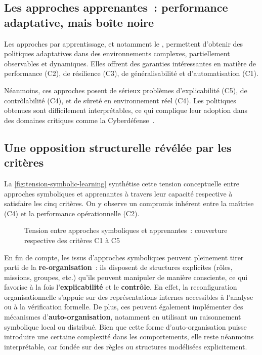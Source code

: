 \subsection{Les approches apprenantes~: performance adaptative, mais boîte noire}

Les approches par apprentissage, et notamment le , permettent d'obtenir des politiques adaptatives dans des environnements complexes, partiellement observables et dynamiques. Elles offrent des garanties intéressantes en matière de performance (C2), de résilience (C3), de généralisabilité et d'automatisation (C1).

Néanmoins, ces approches posent de sérieux problèmes d'explicabilité (C5), de contrôlabilité (C4), et de sûreté en environnement réel (C4). Les politiques obtenues sont difficilement interprétables, ce qui complique leur adoption dans des domaines critiques comme la Cyberdéfense~\cite{Gunning2019}.

\subsection{Une opposition structurelle révélée par les critères}

La \autoref{fig:tension-symbolic-learning} synthétise cette tension conceptuelle entre approches symboliques et apprenantes à travers leur capacité respective à satisfaire les cinq critères. On y observe un compromis inhérent entre la maîtrise (C4) et la performance opérationnelle (C2).

\begin{figure}[H]
  \centering
  \resizebox{\textwidth}{!}{%
    
  }
  \caption{Tension entre approches symboliques et apprenantes~: couverture respective des critères C1 à C5}
  \label{fig:tension-symbolic-learning}
\end{figure}

En fin de compte, les  issus d'approches symboliques peuvent pleinement tirer parti de la \textbf{re-organisation}~: ils disposent de structures explicites (rôles, missions, groupes, etc.) qu'ils peuvent manipuler de manière consciente, ce qui favorise à la fois l'\textbf{explicabilité} et le \textbf{contrôle}. En effet, la reconfiguration organisationnelle s'appuie sur des représentations internes accessibles à l'analyse ou à la vérification formelle. De plus, ces  peuvent également implémenter des mécanismes d'\textbf{auto-organisation}, notamment en utilisant un raisonnement symbolique local ou distribué. Bien que cette forme d'auto-organisation puisse introduire une certaine complexité dans les comportements, elle reste néanmoins interprétable, car fondée sur des règles ou structures modélisées explicitement.


